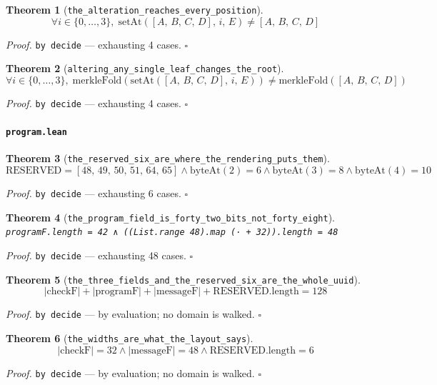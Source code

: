 \documentclass[11pt]{article}
\newtheorem{theorem}{Theorem}[section]
\begin{document}
\begin{theorem}[\texttt{the\_alteration\_reaches\_every\_position}]
\[ \forall i \in \{0,\dots,3\},\; \mathrm{setAt}\mathopen{}\left([A,\,B,\,C,\,D],\,i,\,E\right) \neq [A,\,B,\,C,\,D] \]
\end{theorem}
\noindent\emph{Proof.} \texttt{by decide} --- exhausting 4 cases. \hfill$\square$

\begin{theorem}[\texttt{altering\_any\_single\_leaf\_changes\_the\_root}]
\[ \forall i \in \{0,\dots,3\},\; \mathrm{merkleFold}\mathopen{}\left(\mathrm{setAt}\mathopen{}\left([A,\,B,\,C,\,D],\,i,\,E\right)\right) \neq \mathrm{merkleFold}\mathopen{}\left([A,\,B,\,C,\,D]\right) \]
\end{theorem}
\noindent\emph{Proof.} \texttt{by decide} --- exhausting 4 cases. \hfill$\square$

\paragraph{\texttt{program.lean}}

\begin{theorem}[\texttt{the\_reserved\_six\_are\_where\_the\_rendering\_puts\_them}]
\[ \mathrm{RESERVED} = [48,\,49,\,50,\,51,\,64,\,65] \land \mathrm{byteAt}\mathopen{}\left(2\right) = 6 \land \mathrm{byteAt}\mathopen{}\left(3\right) = 8 \land \mathrm{byteAt}\mathopen{}\left(4\right) = 10 \]
\end{theorem}
\noindent\emph{Proof.} \texttt{by decide} --- exhausting 6 cases. \hfill$\square$

\begin{theorem}[\texttt{the\_program\_field\_is\_forty\_two\_bits\_not\_forty\_eight}]
\texttt{programF.length = 42 ∧ ((List.range 48).map (· + 32)).length = 48}
\end{theorem}
\noindent\emph{Proof.} \texttt{by decide} --- exhausting 48 cases. \hfill$\square$

\begin{theorem}[\texttt{the\_three\_fields\_and\_the\_reserved\_six\_are\_the\_whole\_uuid}]
\[ \left|\mathrm{checkF}\right| + \left|\mathrm{programF}\right| + \left|\mathrm{messageF}\right| + \mathrm{RESERVED.length} = 128 \]
\end{theorem}
\noindent\emph{Proof.} \texttt{by decide} --- by evaluation; no domain is walked. \hfill$\square$

\begin{theorem}[\texttt{the\_widths\_are\_what\_the\_layout\_says}]
\[ \left|\mathrm{checkF}\right| = 32 \land \left|\mathrm{messageF}\right| = 48 \land \mathrm{RESERVED.length} = 6 \]
\end{theorem}
\noindent\emph{Proof.} \texttt{by decide} --- by evaluation; no domain is walked. \hfill$\square$
\end{document}
